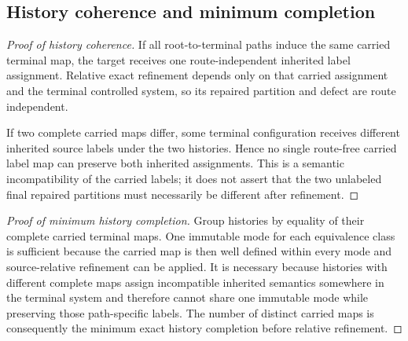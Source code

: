 \subsection{History coherence and minimum completion}
\begin{proof}[Proof of history coherence]
If all root-to-terminal paths induce the same carried terminal map, the target receives one route-independent inherited label assignment. Relative exact refinement depends only on that carried assignment and the terminal controlled system, so its repaired partition and defect are route independent.

If two complete carried maps differ, some terminal configuration receives different inherited source labels under the two histories. Hence no single route-free carried label map can preserve both inherited assignments. This is a semantic incompatibility of the carried labels; it does not assert that the two unlabeled final repaired partitions must necessarily be different after refinement.
\end{proof}

\begin{proof}[Proof of minimum history completion]
Group histories by equality of their complete carried terminal maps. One immutable mode for each equivalence class is sufficient because the carried map is then well defined within every mode and source-relative refinement can be applied. It is necessary because histories with different complete maps assign incompatible inherited semantics somewhere in the terminal system and therefore cannot share one immutable mode while preserving those path-specific labels. The number of distinct carried maps is consequently the minimum exact history completion before relative refinement.
\end{proof}
